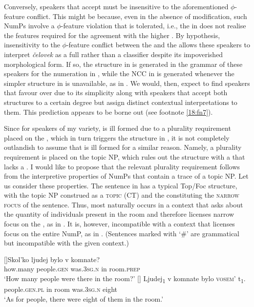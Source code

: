\documentclass[output=paper,modfonts,newtxmath,hidelinks]{langscibook}
\begin{document}
Conversely, speakers that accept  must be insensitive to the aforementioned ${\phi}${}-feature conflict. This might be because, even in the absence of modification, such NumPs involve a ${\phi}${}-feature violation that is tolerated, i.e., the  in  does not realise the   features required for the agreement with the higher . By hypothesis, insensitivity to the ${\phi}${}-feature conflict between the  and the  allows these speakers to interpret \textit{čelovek} as a full  rather than a classifier despite its impoverished morphological form. If so, the structure in  is generated in the grammar of these speakers for the numeration in , while the NCC in  is generated whenever the simpler structure in  is unavailable, as in . We would, then, expect to find speakers that favour  over  due to its simplicity along with speakers that accept both structures to a certain degree but assign distinct contextual interpretations to them. This prediction appears to be borne out (see footnote \ref{18:fn7}).

\largerpage[2]
Since for speakers of my variety,  is ill formed due to a plurality requirement placed on the , which in turn triggers the structure in , it is not completely outlandish to assume that  is ill formed for a similar reason. Namely, a plurality requirement is placed on the topic NP, which rules out the structure with a  that lacks a  . I would like to propose that the relevant plurality requirement follows from the interpretive properties of NumPs that contain a trace of a topic NP. Let us consider these properties. The sentence in  has a typical Top/Foc structure, with the topic NP construed as a \textsc{ topic} (CT) and the  constituting the \textsc{narrow focus} of the sentence. Thus,  most naturally occurs in a context that asks about the quantity of individuals present in the room and therefore licenses narrow focus on the , as in . It is, however, incompatible with a context that licenses focus on the entire NumP, as in . (Sentences marked with ‘\#’ are grammatical but incompatible with the given context.)

\begin{exe} 
\ex \label{18:ex20}
\begin{xlist}
[]{\gll Skol’ko ljudej bylo v komnate?\\
how.many people.\textsc{gen} was.\textsc{3sg.n} in room.\textsc{prep}\\
	\glt `How many people were there in the room?'
    }
[]{ 
	\gll Ljudej\textsubscript{1}    v   komnate  bylo     \textsc{vosem’}   t\textsubscript{1}.\\
		 people.\textsc{gen.pl} in   room    was.\textsc{3sg.n}  eight  \\
	\glt `As for people, there were eight of them in the room.'
    }
\end{xlist}
\end{exe}
\end{document}
